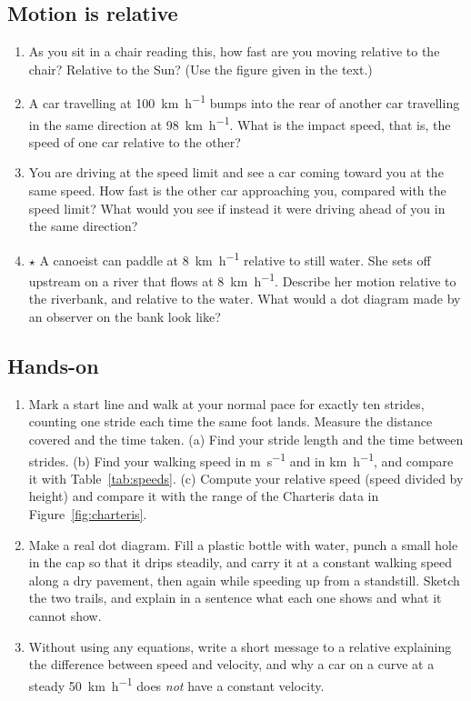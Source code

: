 \documentclass[11pt,twoside,openany]{book}
\begin{document}
\subsection*{Motion is relative}
\begin{enumerate}[label=\textbf{\thechapter.\arabic*},resume=exercises,leftmargin=*]
  \item As you sit in a chair reading this, how fast are you moving relative to the chair? Relative to the Sun? (Use the figure given in the text.)
  \item A car travelling at \SI{100}{\kilo\metre\per\hour} bumps into the rear of another car travelling in the same direction at \SI{98}{\kilo\metre\per\hour}. What is the impact speed, that is, the speed of one car relative to the other?
  \item You are driving at the speed limit and see a car coming toward you at the same speed. How fast is the other car approaching you, compared with the speed limit? What would you see if instead it were driving ahead of you in the same direction?
  \item $\star$ A canoeist can paddle at \SI{8}{\kilo\metre\per\hour} relative to still water. She sets off upstream on a river that flows at \SI{8}{\kilo\metre\per\hour}. Describe her motion relative to the riverbank, and relative to the water. What would a dot diagram made by an observer on the bank look like?
\end{enumerate}

\subsection*{Hands-on}
\begin{enumerate}[label=\textbf{\thechapter.\arabic*},resume=exercises,leftmargin=*]
  \item Mark a start line and walk at your normal pace for exactly ten strides, counting one stride each time the same foot lands. Measure the distance covered and the time taken. (a) Find your stride length and the time between strides. (b) Find your walking speed in \si{\metre\per\second} and in \si{\kilo\metre\per\hour}, and compare it with Table~\ref{tab:speeds}. (c) Compute your relative speed (speed divided by height) and compare it with the range of the Charteris data in Figure~\ref{fig:charteris}.
  \item Make a real dot diagram. Fill a plastic bottle with water, punch a small hole in the cap so that it drips steadily, and carry it at a constant walking speed along a dry pavement, then again while speeding up from a standstill. Sketch the two trails, and explain in a sentence what each one shows and what it cannot show.
  \item Without using any equations, write a short message to a relative explaining the difference between speed and velocity, and why a car on a curve at a steady \SI{50}{\kilo\metre\per\hour} does \emph{not} have a constant velocity.
\end{enumerate}
\end{document}
